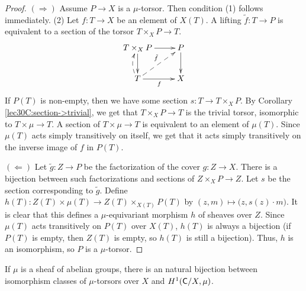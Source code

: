 \begin{proof}
 $(\Rightarrow)$ Assume $P\to X$ is a $\mu$-torsor. Then condition (1) follows immediately. (2) Let $f:T\to X$ be an element of $X(T)$. A lifting $\tilde f:T\to P$ is equivalent to a section of the torsor $T\times_X P\to T$.
 \[\xymatrix{
  T\times_X P \ar[r]\ar[d] & P\ar[d]\\
  T\ar[r]_f\ar@{-->}[ur]^{\tilde f} \ar@{-->}@/^/[u]& X
 }\]
 If $P(T)$ is non-empty, then we have some section $s:T\to T\times_X P$. By Corollary \ref{lec30C:section->trivial}, we get that $T\times_X P\to T$ is the trivial torsor, isomorphic to $T\times \mu\to T$. A section of $T\times \mu\to T$ is equivalent to an element of $\mu(T)$. Since $\mu(T)$ acts simply transitively on itself, we get that it acts simply transitively on the inverse image of $f$ in $P(T)$.

 $(\Leftarrow)$ Let $\tilde g:Z\to P$ be the factorization of the cover $g:Z\to X$. There is a bijection between such factorizations and sections of $Z\times_X P\to Z$. Let $s$ be the section corresponding to $\tilde g$. Define $h(T):Z(T)\times \mu(T)\to Z(T)\times_{X(T)}P(T)$ by $(z,m)\mapsto \bigl(z,s(z)\cdot m\bigr)$. It is clear that this defines a $\mu$-equivariant morphism $h$ of sheaves over $Z$. Since $\mu(T)$ acts transitively on $P(T)$ over $X(T)$, $h(T)$ is always a bijection (if $P(T)$ is empty, then $Z(T)$ is empty, so $h(T)$ is still a bijection). Thus, $h$ is an isomorphism, so $P$ is a $\mu$-torsor.
\end{proof}
\begin{theorem} \label{lec30T:H^1(mu)<->mu-torsors}
 If $\mu$ is a sheaf of abelian groups, there is an natural bijection between isomorphism classes of $\mu$-torsors over $X$ and $H^1(\text{\sf C}/X,\mu)$. 
\end{theorem}
